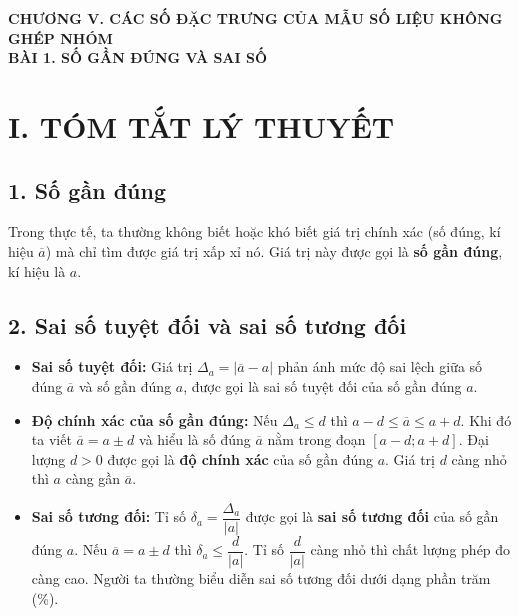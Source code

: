 
\begin{center}
	{\Large\bfseries\color{blue!80!black} CHƯƠNG V. CÁC SỐ ĐẶC TRƯNG CỦA MẪU SỐ LIỆU KHÔNG GHÉP NHÓM}\\[6pt]
	{\large\bfseries\color{red!80!black} BÀI 1. SỐ GẦN ĐÚNG VÀ SAI SỐ}
\end{center}
\vspace{0.2cm}

\section*{I. TÓM TẮT LÝ THUYẾT}

\subsection*{1. Số gần đúng}
Trong thực tế, ta thường không biết hoặc khó biết giá trị chính xác (số đúng, kí hiệu $\overline{a}$) mà chỉ tìm được giá trị xấp xỉ nó. Giá trị này được gọi là \textbf{số gần đúng}, kí hiệu là $a$.

\subsection*{2. Sai số tuyệt đối và sai số tương đối}
\begin{itemize}
	\item \textbf{Sai số tuyệt đối:} Giá trị $\Delta_a = |\overline{a} - a|$ phản ánh mức độ sai lệch giữa số đúng $\overline{a}$ và số gần đúng $a$, được gọi là sai số tuyệt đối của số gần đúng $a$.
	\item \textbf{Độ chính xác của số gần đúng:} Nếu $\Delta_a \le d$ thì $a - d \le \overline{a} \le a + d$. Khi đó ta viết $\overline{a} = a \pm d$ và hiểu là số đúng $\overline{a}$ nằm trong đoạn $[a - d; a + d]$. Đại lượng $d > 0$ được gọi là \textbf{độ chính xác} của số gần đúng $a$. Giá trị $d$ càng nhỏ thì $a$ càng gần $\overline{a}$.
	\item \textbf{Sai số tương đối:} Tỉ số $\delta_a = \dfrac{\Delta_a}{|a|}$ được gọi là \textbf{sai số tương đối} của số gần đúng $a$. Nếu $\overline{a} = a \pm d$ thì $\delta_a \le \dfrac{d}{|a|}$. Tỉ số $\dfrac{d}{|a|}$ càng nhỏ thì chất lượng phép đo càng cao. Người ta thường biểu diễn sai số tương đối dưới dạng phần trăm (\%).
\end{itemize}


